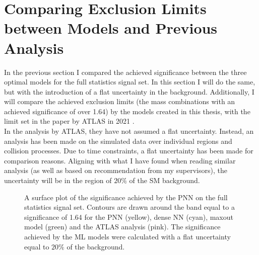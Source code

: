 \section{Comparing Exclusion Limits between Models and Previous Analysis}
In the previous section I compared the achieved significance between 
the three optimal models for the full statistics signal set. In this section 
I will do the same, but with the introduction of a flat uncertainty in the background.
Additionally, I will compare the achieved exclusion limits (the mass combinations with an achieved 
significance of over 1.64) by the models created in this thesis, with the limit set in the paper by \ac{ATLAS} 
in 2021 \cite{atlas_search_2021}.
\\
In the analysis by \ac{ATLAS}, they have not assumed a flat uncertainty. Instead, an analysis has been made on the simulated data 
over individual regions and collision processes. Due to time constraints, a flat uncertainty has been made for comparison 
reasons. Aligning with what I have found when reading similar analysis (as well as based on recommendation from my supervisors), 
the uncertainty will be in the region of $20\%$ of the \ac{SM} background.\\
\begin{figure}
    \caption[A surface plot of the significance comparing sensitivity limits set by \ac{PNN}, dense \ac{NN}, maxout model
    and the \ac{ATLAS} analysis, where the models have assumed a flat uncertainty of $20\%$.]{A surface plot of the significance achieved 
    by the \ac{PNN} on the full statistics signal set. Contours are drawn around the band equal to a significance of 1.64 for the \ac{PNN} 
    (yellow), dense \ac{NN} (cyan), maxout model (green) and the \ac{ATLAS} analysis (pink). The significance achieved by the \ac{ML} models were 
    calculated with a flat uncertainty equal to $20\%$ of the background.}
    \label{fig:compLimit20}
\end{figure}
